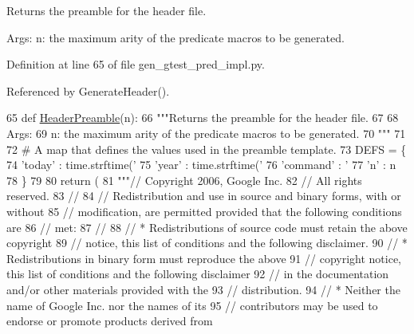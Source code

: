 \begin{DoxyVerb}Returns the preamble for the header file.

Args:
  n:  the maximum arity of the predicate macros to be generated.
\end{DoxyVerb}
 

Definition at line 65 of file gen\+\_\+gtest\+\_\+pred\+\_\+impl.\+py.



Referenced by Generate\+Header().


\begin{DoxyCode}
65 \textcolor{keyword}{def }\hyperlink{namespacegen__gtest__pred__impl_a0b99cadcffab4bf161654a382163bac8}{HeaderPreamble}(n):
66   \textcolor{stringliteral}{"""Returns the preamble for the header file.}
67 \textcolor{stringliteral}{}
68 \textcolor{stringliteral}{  Args:}
69 \textcolor{stringliteral}{    n:  the maximum arity of the predicate macros to be generated.}
70 \textcolor{stringliteral}{  """}
71 
72   \textcolor{comment}{# A map that defines the values used in the preamble template.}
73   DEFS = \{
74     \textcolor{stringliteral}{'today'} : time.strftime(\textcolor{stringliteral}{'%
75     \textcolor{stringliteral}{'year'} : time.strftime(\textcolor{stringliteral}{'%
76     \textcolor{stringliteral}{'command'} : \textcolor{stringliteral}{'%
77     \textcolor{stringliteral}{'n'} : n
78     \}
79 
80   \textcolor{keywordflow}{return} (
81 \textcolor{stringliteral}{"""// Copyright 2006, Google Inc.}
82 \textcolor{stringliteral}{// All rights reserved.}
83 \textcolor{stringliteral}{//}
84 \textcolor{stringliteral}{// Redistribution and use in source and binary forms, with or without}
85 \textcolor{stringliteral}{// modification, are permitted provided that the following conditions are}
86 \textcolor{stringliteral}{// met:}
87 \textcolor{stringliteral}{//}
88 \textcolor{stringliteral}{//     * Redistributions of source code must retain the above copyright}
89 \textcolor{stringliteral}{// notice, this list of conditions and the following disclaimer.}
90 \textcolor{stringliteral}{//     * Redistributions in binary form must reproduce the above}
91 \textcolor{stringliteral}{// copyright notice, this list of conditions and the following disclaimer}
92 \textcolor{stringliteral}{// in the documentation and/or other materials provided with the}
93 \textcolor{stringliteral}{// distribution.}
94 \textcolor{stringliteral}{//     * Neither the name of Google Inc. nor the names of its}
95 \textcolor{stringliteral}{// contributors may be used to endorse or promote products derived from}
}}}
\end{DoxyCode}
